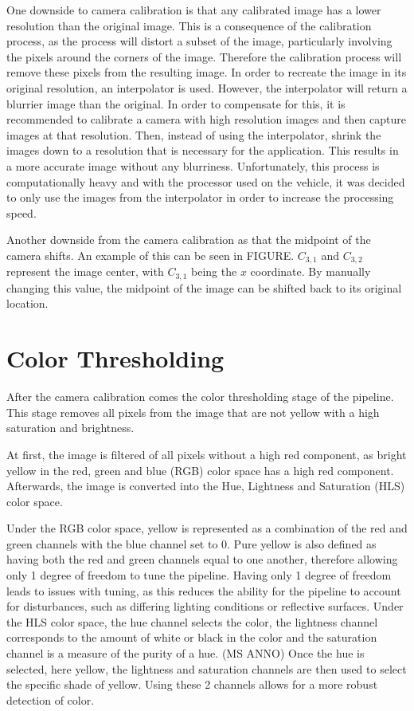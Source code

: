 \documentclass[arbeit=studie,oneside,BCOR=12mm]{ArbeitRST}
\begin{document}
One downside to camera calibration is that any calibrated image has a lower 
resolution than the original image. This is a consequence of the calibration 
process, as the process will distort a subset of the image, particularly 
involving the pixels around the corners of the image. 
Therefore the calibration process will remove these pixels from the resulting 
image. In order to recreate the image in its original resolution, an 
interpolator is used. 
However, the interpolator will return a blurrier image than the original. 
In order to compensate for this, it is recommended to calibrate a camera with 
high resolution images and then capture images at that resolution. 
Then, instead of using the interpolator, shrink the images down to a resolution
that is necessary for the application.  
This results in a more accurate image without any blurriness. 
Unfortunately, this process is computationally heavy and with the processor 
used on the vehicle, it was decided to only use the images from the interpolator
in order to increase the processing speed.

Another downside from the camera calibration as that the midpoint of the camera
shifts. An example of this can be seen in FIGURE. $C_{3,1}$ and $C_{3,2}$ 
represent the image center, with $C_{3,1}$ being the $x$ coordinate. By manually
changing this value, the midpoint of the image can be shifted back to its 
original location.

\section{Color Thresholding}
After the camera calibration comes the color thresholding stage of the pipeline.
This stage removes all pixels from the image that are not yellow with a high
saturation and brightness. 

At first, the image is filtered of all pixels without a high red component, as 
bright yellow in the red, green and blue (RGB) color space has a high red 
component. 
Afterwards, the image is converted into the Hue, Lightness and Saturation (HLS)
color space. 

Under the RGB color space, yellow is represented as a combination of the red 
and green channels with the blue channel set to 0. Pure yellow is also defined 
as having both the red and green channels equal to one another, therefore 
allowing only 1 degree of freedom to tune the pipeline.  Having only 1 degree 
of freedom leads to issues with tuning, as this reduces the ability for the 
pipeline to account for disturbances, such as differing lighting conditions or 
reflective surfaces.
Under the HLS color space, the hue channel selects the color, the lightness 
channel corresponds to the amount of white or black in the color and the 
saturation channel is a measure of the purity of a hue. (MS ANNO) Once the hue 
is selected, here yellow, the lightness and saturation channels are then used 
to select the specific shade of yellow. Using these 2 channels allows for a 
more robust detection of color.
\end{document}
